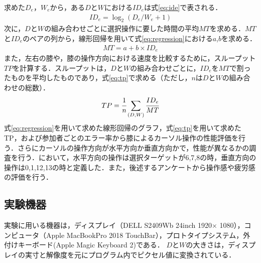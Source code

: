 \documentclass[submit, techrep]{ipsj}
\begin{document}
求めた$D_e$，$W_e$から，ある$D$と$W$における$ID_e$は式\ref{eq:ide}で表される．
\begin{eqnarray}
	ID_e = \log_2{(D_e/W_e + 1)}
	\label{eq:ide}
\end{eqnarray}
次に，$D$と$W$の組み合わせごとに選択操作に要した時間の平均$MT$を求める．$MT$と$ID_e$のペアの列から，線形回帰を用いて式\ref{eq:regression}における$a$,$b$を求める．
\begin{eqnarray}
	MT = a + b \times  ID_e
	\label{eq:regression}
\end{eqnarray}
また，左右の膝や，膝の操作方向における速度を比較するために，スループット$TP$を計算する．スループットは，$D$と$W$の組み合わせごとに，$ID_e$を$MT$で割ったものを平均したものであり，式\ref{eq:tp}で求める（ただし，$n$は$D$と$W$の組み合わせの総数）．
\begin{eqnarray}
	TP = \cfrac{1}{n} \sum_{(D,W)} \cfrac{ID_e}{MT}
	\label{eq:tp}
\end{eqnarray}
式\ref{eq:regression}を用いて求めた線形回帰のグラフ，式\ref{eq:tp}を用いて求めたTP，および参加者ごとのエラー率から膝によるカーソル操作の性能評価を行う．さらにカーソルの操作方向が水平方向か垂直方向かで，性能が異なるかの調査を行う．において，水平方向の操作は選択ターゲットが6,7,8の時，垂直方向の操作は0,1,12,13の時と定義した．また，後述するアンケートから操作感や疲労感の評価を行う．

\subsection{実験機器}
実験に用いる機器は，ディスプレイ（DELL S2409Wb 24inch 1920$\times$ 1080），コンピュータ（Apple MacBookPro 2018 TouchBar），プロトタイプシステム，外付けキーボード(Apple Magic Keyboard 2)である．
$D$と$W$の大きさは，ディスプレイの実寸と解像度を元にプログラム内でピクセル値に変換されている．
\end{document}
